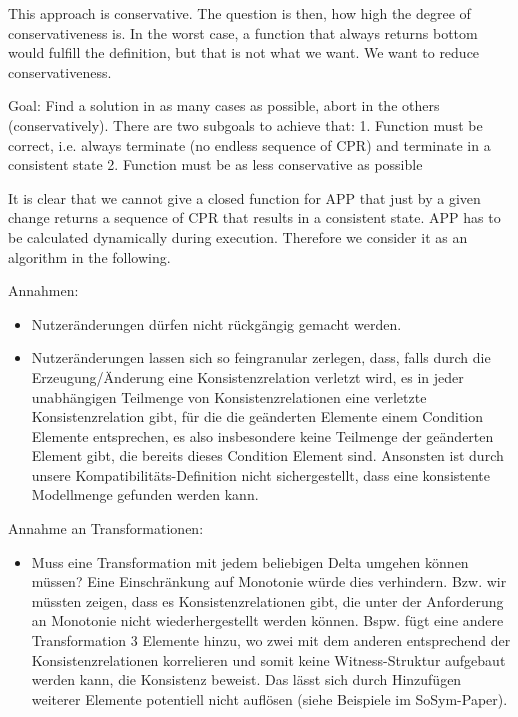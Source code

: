 This approach is conservative. The question is then, how high the degree of conservativeness is. In the worst case, a function that always returns bottom would fulfill the definition, but that is not what we want. We want to reduce conservativeness.

Goal: Find a solution in as many cases as possible, abort in the others (conservatively). There are two subgoals to achieve that:
1. Function must be correct, i.e. always terminate (no endless sequence of CPR) and terminate in a consistent state
2. Function must be as less conservative as possible

It is clear that we cannot give a closed function for APP that just by a given change returns a sequence of CPR that results in a consistent state. APP has to be calculated dynamically during execution. Therefore we consider it as an algorithm in the following.

Annahmen:
\begin{itemize}
    \item Nutzeränderungen dürfen nicht rückgängig gemacht werden.
    \item Nutzeränderungen lassen sich so feingranular zerlegen, dass, falls durch die Erzeugung/Änderung eine Konsistenzrelation verletzt wird, es in jeder unabhängigen Teilmenge von Konsistenzrelationen eine verletzte Konsistenzrelation gibt, für die die geänderten Elemente einem Condition Elemente entsprechen, es also insbesondere keine Teilmenge der geänderten Element gibt, die bereits dieses Condition Element sind. Ansonsten ist durch unsere Kompatibilitäts-Definition nicht sichergestellt, dass eine konsistente Modellmenge gefunden werden kann.
\end{itemize}

Annahme an Transformationen:
\begin{itemize}
    \item Muss eine Transformation mit jedem beliebigen Delta umgehen können müssen? Eine Einschränkung auf Monotonie würde dies verhindern. Bzw. wir müssten zeigen, dass es Konsistenzrelationen gibt, die unter der Anforderung an Monotonie nicht wiederhergestellt werden können. Bspw. fügt eine andere Transformation 3 Elemente hinzu, wo zwei mit dem anderen entsprechend der Konsistenzrelationen korrelieren und somit keine Witness-Struktur aufgebaut werden kann, die Konsistenz beweist. Das lässt sich durch Hinzufügen weiterer Elemente potentiell nicht auflösen (siehe Beispiele im SoSym-Paper).
\end{itemize}


